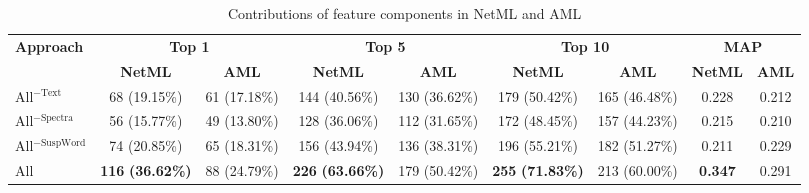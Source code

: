 \begin{table*}[t]
	\caption{Contributions of feature components in NetML and AML}
	\centering
%
%
%

\begin{tabular}{|l|c|c|c|c|c|c|c|c|}
	\hline 
	\multirow{2}{*}{\textbf{Approach}} & \multicolumn{2}{c|}{\textbf{Top 1}} & \multicolumn{2}{c|}{\textbf{Top 5}} & \multicolumn{2}{c|}{\textbf{Top 10}} & \multicolumn{2}{c|}{\textbf{MAP}}\tabularnewline
	\cline{2-9} 
	& \textbf{NetML} & \textbf{AML} & \textbf{NetML} & \textbf{AML} & \textbf{NetML} & \textbf{AML} & \textbf{NetML} & \textbf{AML}\tabularnewline
	\hline 
	\hline
	All$^{-\text{Text}}$ & 68 (19.15\%)  & 61 (17.18\%) & 144 (40.56\%) & 130 (36.62\%) & 179 (50.42\%) & 165 (46.48\%) & 0.228 & 0.212\\
	All$^{-\text{Spectra}}$ & 56 (15.77\%) & 49 (13.80\%) & 128 (36.06\%) & 112 (31.65\%) & 172 (48.45\%) & 157 (44.23\%) & 0.215 & 0.210\\
	All$^{-\text{SuspWord}}$ & 74 (20.85\%) & 65 (18.31\%) & 156 (43.94\%) & 136 (38.31\%) & 196 (55.21\%) & 182 (51.27\%) & 0.211 & 0.229\\
	\hline
	All & \textbf{116} \textbf{(36.62\%)} & 88 (24.79\%) & \textbf{226} \textbf{(63.66\%)} & 179 (50.42\%) & \textbf{255} \textbf{(71.83\%)} & 213 (60.00\%) & \textbf{0.347} & 0.291\\
	\hline 
\end{tabular}

    \label{tab:AML_variants}
\end{table*}





